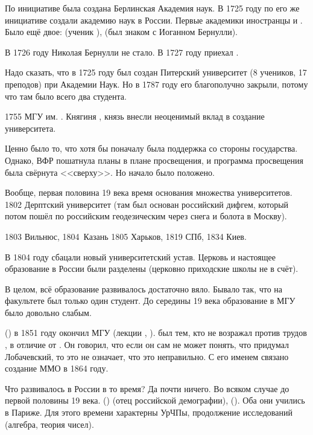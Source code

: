 \documentclass[a4paper,oneside,fleqn,10pt]{article}
\begin{document}
По инициативе  была создана Берлинская
Академия наук.  В 1725 году по его же инициативе создали академию наук
в России.  Первые академики иностранцы  и .  Было ещё
двое:  (ученик ),
 (был знаком с Иоганном
Бернулли).

В 1726 году Николая Бернулли не стало. В 1727 году приехал
.

Надо сказать, что в 1725 году был создан Питерский университет (8
учеников, 17 преподов) при Академии Наук. Но в 1787 году его
благополучно закрыли, потому что там было всего два студента.

1755 МГУ им. . Княгиня ,
князь  внесли неоценимый вклад в создание университета.

Ценно было то, что хотя бы поначалу была поддержка со стороны
государства.  Однако, ВФР пошатнула планы 
в плане просвещения, и программа просвещения была свёрнута
<<сверху>>. Но начало было положено.

Вообще, первая половина 19 века время основания множества
университетов.  1802 Дерптский университет (там
 был основан российский дифгем, который
потом пошёл по российским геодезическим через снега и болота в
Москву).

1803 Вильнюс, 1804\ Казань 1805 Харьков, 1819 СПб, 1834 Киев.

В 1804 году сбацали новый университетский устав.  Церковь и настоящее
образование в России были разделены (церковно приходские школы не в
счёт).

В целом, всё образование развивалось достаточно вяло.  Бывало так, что
на факультете был только один студент.  До середины 19 века
образование в МГУ было довольно слабым.

 () в 1851 году окончил МГУ (лекции
, ).
 был тем, кто не возражал против трудов
, в отличие от
. Он говорил, что если он сам не
может понять, что придумал Лобачевский, то это не означает, что это
неправильно.  С его именем связано создание ММО в 1864 году.

Что развивалось в России в то время? Да почти ничего. Во всяком случае
до первой половины 19 века.   () (отец
российской демографии), 
(). Оба они учились в Париже.  Для этого времени
характерны УрЧПы, продолжение исследований 
(алгебра, теория чисел).
\end{document}
